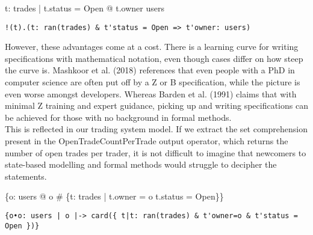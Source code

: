 \documentclass{article}
\begin{document}
\begin{zed}
\forall t: \ran trades | t.status = Open @ t.owner \in users \\ 
\end{zed}

\begin{verbatim}
!(t).(t: ran(trades) & t'status = Open => t'owner: users)
\end{verbatim}
\pagebreak

\hspace{-0.68cm} However, these advantages come at a cost. There is a learning curve for writing specifications with mathematical notation, even though cases differ on how steep the curve is. Mashkoor et al. (2018) references that even people with a PhD in computer science are often put off by a Z or B specification, while the picture is even worse amongst developers. Whereas Barden et al. (1991) claims that with minimal Z training and expert guidance, picking up and writing specifications can be achieved for those with no background in formal methods. \\
\newline
\hspace{-0.68cm} This is reflected in our trading system model. If we extract the set comprehension present in the OpenTradeCountPerTrade output operator, which returns the number of open trades per trader, it is not difficult to imagine that newcomers to state-based modelling and formal methods would struggle to decipher the statements.

\begin{zed}
\{o: users @ o \mapsto \# \{t: \ran trades | t.owner = o \land t.status = Open\}\}
\end{zed}

\begin{verbatim}
{o•o: users | o |-> card({ t|t: ran(trades) & t'owner=o & t'status = Open })}
\end{verbatim}
\end{document}
